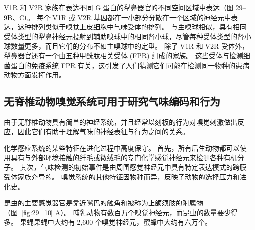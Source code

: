 V1R 和 V2R 家族在表达不同 G 蛋白的犁鼻器官的不同空间区域中表达（图 29–9B、C）。
每个 V1R 或 V2R 基因都在一小部分分散在一个区域的神经元中表达，这种排列类似于嗅觉上皮细胞中气味受体的排列。
与主嗅球相似，具有相同受体类型的犁鼻神经元投射到辅助嗅球中的相同肾小球，尽管每种受体类型的肾小球数量更多，而且它们的分布不如主嗅球中的定型。
除了 V1R 和 V2R 受体外，犁鼻器官还有一个由五种甲酰肽相关受体 (FPR) 组成的家族。
这些受体与检测细菌蛋白的免疫系统 FPR 有关，这引发了人们猜测它们可能在检测同一物种的患病动物方面发挥作用。



\subsection{无脊椎动物嗅觉系统可用于研究气味编码和行为}

由于无脊椎动物具有简单的神经系统，并且经常以刻板的行为对嗅觉刺激做出反应，因此它们有助于理解气味的神经表征与行为之间的关系。


化学感应系统的某些特征在进化过程中高度保守。
首先，所有后生动物都可以使用具有与外部环境接触的纤毛或微绒毛的专门化学感觉神经元来检测各种有机分子。 
其次，气味检测的初始事件是由周围感觉神经元中具有特定表达模式的跨膜受体家族介导的。
嗅觉系统的其他特征因物种而异，反映了动物的选择压力和进化史。


昆虫的主要感觉器官是靠近嘴巴的触角和被称为上颌须肢的附属物（图~\ref{fig:29_10} A）。
哺乳动物有数百万个嗅觉神经元，而昆虫的数量要少得多。
果蝇果蝇中大约有 2,600 个嗅觉神经元，蜜蜂中大约有六万个。


